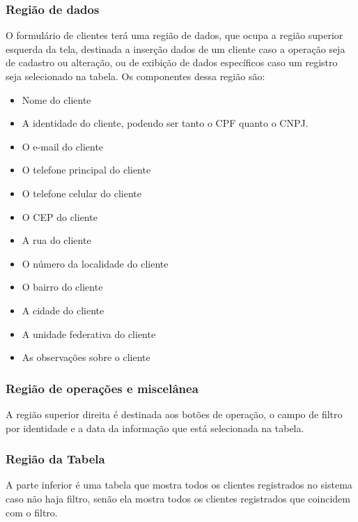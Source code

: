 \documentclass[12pt, a4paper,  article, brazil]{abntex2}
\begin{document}
			\subsubsection{Região de dados}
			O formulário de clientes terá uma região de dados, que ocupa a região superior esquerda da tela, destinada a inserção dados de um cliente caso a operação seja de cadastro ou alteração, ou de exibição de dados específicos caso um registro seja selecionado na tabela.
			Os componentes dessa região são:
				\begin{itemize}\itemsep1.5pt
					\item Nome do cliente
					\item A identidade do cliente, podendo ser tanto o CPF quanto o CNPJ.
					\item O e-mail do cliente
					\item O telefone principal do cliente
					\item O telefone celular do cliente
					\item O CEP do cliente
					\item A rua do cliente
					\item O número da localidade do cliente
					\item O bairro do cliente
					\item A cidade do cliente
					\item A unidade federativa do cliente
					\item As observações sobre o cliente
				\end{itemize}	
			\subsubsection{Região de operações e miscelânea}
			A região superior direita é destinada aos botões de operação, o campo de filtro por identidade e a data da informação que está selecionada na tabela.
			\subsubsection{Região da Tabela}
			A parte inferior é uma tabela que mostra todos os clientes registrados no sistema caso não haja filtro, senão ela mostra todos os clientes registrados que coincidem com o filtro.
		\newpage
\end{document}
